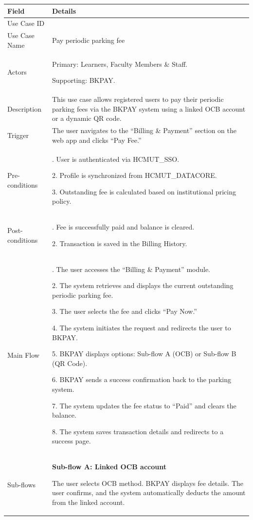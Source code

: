 \begin{table}[H]
\small
\renewcommand{\arraystretch}{1.4}
\begin{tabularx}{\textwidth}{|>{\raggedright\arraybackslash}p{3.5cm}|>{\RaggedRight\arraybackslash}X|}
\hline
\rowcolor{gray!20} \textbf{Field} & \textbf{Details} \\
\hline
Use Case ID & 3.1 \\
\hline
Use Case Name & Pay periodic parking fee \\
\hline
Actors & Primary: Learners, Faculty Members \& Staff. \par Supporting: BKPAY. \\
\hline
Description & This use case allows registered users to pay their periodic parking fees via the BKPAY system using a linked OCB account or a dynamic QR code. \\
\hline
Trigger & The user navigates to the ``Billing \& Payment'' section on the web app and clicks ``Pay Fee.'' \\
\hline
Pre-conditions & 1. User is authenticated via HCMUT\_SSO. \par 2. Profile is synchronized from HCMUT\_DATACORE. \par 3. Outstanding fee is calculated based on institutional pricing policy. \\
\hline
Post-conditions & 1. Fee is successfully paid and balance is cleared. \par 2. Transaction is saved in the Billing History. \\
\hline
Main Flow & 
1. The user accesses the ``Billing \& Payment'' module. \par
2. The system retrieves and displays the current outstanding periodic parking fee. \par
3. The user selects the fee and clicks ``Pay Now.'' \par
4. The system initiates the request and redirects the user to BKPAY. \par
5. BKPAY displays options: Sub-flow A (OCB) or Sub-flow B (QR Code). \par
6. BKPAY sends a success confirmation back to the parking system. \par
7. The system updates the fee status to ``Paid'' and clears the balance. \par
8. The system saves transaction details and redirects to a success page. \\
\hline
Sub-flows & 
\textbf{Sub-flow A: Linked OCB account} \par
The user selects OCB method. BKPAY displays fee details. The user confirms, and the system automatically deducts the amount from the linked account. \par \vspace{0.5em}

\end{tabularx}
\end{table}

